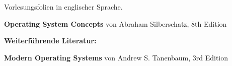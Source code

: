 \begin{course}
\begin{media}Vorlesungsfolien in englischer Sprache.

\end{media}

\begin{literature}\textbf{Operating System Concepts} von Abraham Silberschatz, 8th Edition

 

\textbf{Weiterführende Literatur:}

 

\textbf{Modern Operating Systems }von Andrew S. Tanenbaum, 3rd Edition

\end{literature}



\end{course}